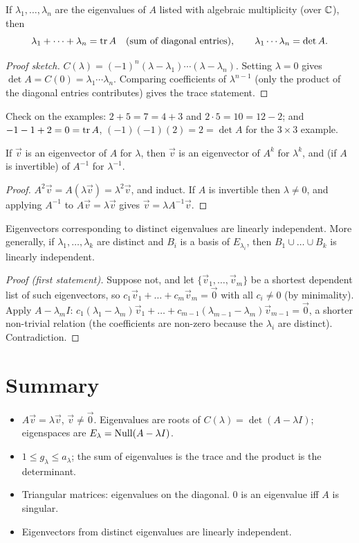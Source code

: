 \begin{theorem}
If $\lambda_1,\dots,\lambda_n$ are the eigenvalues of $A$ listed with algebraic multiplicity (over $\mathbb{C}$), then
\[
  \lambda_1+\dots+\lambda_n=\operatorname{tr} A \quad(\text{sum of diagonal entries}),\qquad
  \lambda_1\cdots\lambda_n=\det A .
\]
\end{theorem}
\begin{proof}[Proof sketch]
$C(\lambda)=(-1)^n(\lambda-\lambda_1)\cdots(\lambda-\lambda_n)$. Setting $\lambda=0$ gives
$\det A=C(0)=\lambda_1\cdots\lambda_n$. Comparing coefficients of $\lambda^{n-1}$ (only the product of the diagonal
entries contributes) gives the trace statement.
\end{proof}

Check on the examples: $2+5=7=4+3$ and $2\cdot5=10=12-2$; and $-1-1+2=0=\operatorname{tr} A$,
$(-1)(-1)(2)=2=\det A$ for the $3\times3$ example.

\begin{theorem}
If $\vec v$ is an eigenvector of $A$ for $\lambda$, then $\vec v$ is an eigenvector of $A^k$ for $\lambda^k$, and
(if $A$ is invertible) of $A^{-1}$ for $\lambda^{-1}$.
\end{theorem}
\begin{proof}
$A^2\vec v=A(\lambda\vec v)=\lambda^2\vec v$, and induct. If $A$ is invertible then $\lambda\ne0$, and applying
$A^{-1}$ to $A\vec v=\lambda\vec v$ gives $\vec v=\lambda A^{-1}\vec v$.
\end{proof}

\begin{theorem}
Eigenvectors corresponding to distinct eigenvalues are linearly independent. More generally, if
$\lambda_1,\dots,\lambda_k$ are distinct and $B_i$ is a basis of $E_{\lambda_i}$, then $B_1\cup\dots\cup B_k$ is
linearly independent.
\end{theorem}
\begin{proof}[Proof (first statement)]
Suppose not, and let $\{\vec v_1,\dots,\vec v_m\}$ be a shortest dependent list of such eigenvectors, so
$c_1\vec v_1+\dots+c_m\vec v_m=\vec0$ with all $c_i\neq0$ (by minimality). Apply $A-\lambda_mI$:
$c_1(\lambda_1-\lambda_m)\vec v_1+\dots+c_{m-1}(\lambda_{m-1}-\lambda_m)\vec v_{m-1}=\vec0$, a shorter non-trivial
relation (the coefficients are non-zero because the $\lambda_i$ are distinct). Contradiction.
\end{proof}

\section*{Summary}
\begin{itemize}
  \item $A\vec v=\lambda\vec v$, $\vec v\ne\vec 0$. Eigenvalues are roots of $C(\lambda)=\det(A-\lambda I)$;
        eigenspaces are $E_\lambda=\operatorname{Null}(A-\lambda I)$.
  \item $1\le g_\lambda\le a_\lambda$; the sum of eigenvalues is the trace and the product is the determinant.
  \item Triangular matrices: eigenvalues on the diagonal. $0$ is an eigenvalue iff $A$ is singular.
  \item Eigenvectors from distinct eigenvalues are linearly independent.
\end{itemize}
